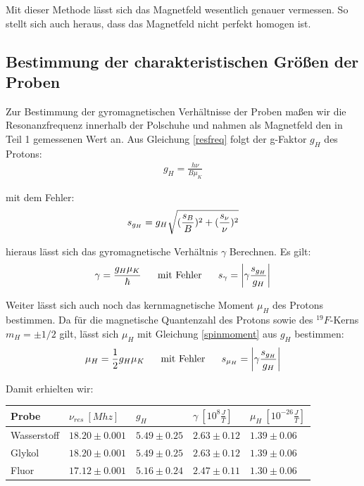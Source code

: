 \documentclass[12pt]{article}
\begin{document}
Mit dieser Methode lässt sich das Magnetfeld wesentlich genauer vermessen. So stellt sich auch heraus, dass das Magnetfeld nicht perfekt homogen ist.
\newpage

\subsection{Bestimmung der charakteristischen Größen der Proben}

Zur Bestimmung der gyromagnetischen Verhältnisse der Proben maßen wir die Resonanzfrequenz innerhalb der Polschuhe und nahmen als Magnetfeld den in Teil 1 gemessenen Wert an. Aus Gleichung \ref{resfreq} folgt der g-Faktor $g_H$ des Protons:
\begin{align}
 g_H = \frac{h\nu}{B \mu_K}
\end{align}

mit dem Fehler:
\begin{align}
 \notag s_{g_H} = g_H \sqrt{(\frac{s_B}{B})^2+(\frac{s_{\nu}}{\nu})^2}
\end{align}

hieraus lässt sich das gyromagnetische Verhältnis $\gamma$ Berechnen. Es gilt:
\begin{align}
 \gamma = \frac{g_H \mu_K}{\hbar}~~~~~\textnormal{mit Fehler}~~~~~s_{\gamma} = \left| \gamma \frac{s_{g_H}}{g_H} \right|
\end{align}

Weiter lässt sich auch noch das kernmagnetische Moment $\mu_H$ des Protons bestimmen. Da für die magnetische Quantenzahl des Protons sowie des $^{19}F$-Kerns $m_H = \pm1/2$ gilt, lässt sich $\mu_H$ mit Gleichung \ref{spinmoment} aus $g_H$ bestimmen:
\begin{align}
 \mu_H = \frac{1}{2} g_H \mu_K~~~~~\textnormal{mit Fehler}~~~~~s_{\mu_H}= \left| \gamma \frac{s_{g_H}}{g_H} \right|
\end{align}

Damit erhielten wir:
\\

\begin{center}
\begin{tabular}{|l|llll|}
\hline
Probe & $\nu_{res}~[Mhz]$ & $g_H$ & $\gamma~[10^8\frac{J}{T}]$ & $\mu_H~[10^{-26}\frac{J}{T}]$ \\ 
\hline
Wasserstoff & $18.20\pm0.001$ & $5.49\pm0.25$ & $2.63\pm0.12$ & $1.39\pm0.06$ \\ 
Glykol & $18.20\pm0.001$ & $5.49\pm0.25$ & $2.63\pm0.12$ & $1.39\pm0.06$ \\ 
Fluor & $17.12\pm0.001$ & $5.16\pm0.24$ & $2.47\pm0.11$ & $1.30\pm0.06$ \\
\hline
\end{tabular}
\end{center}
\newpage
\end{document}

